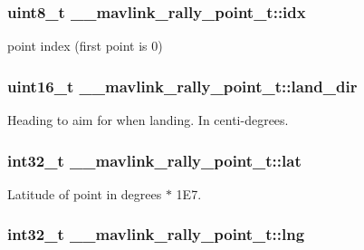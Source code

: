 \hypertarget{struct____mavlink__rally__point__t_a44e656a447965ea917a6d79001cd1b07}{
\subsubsection[{idx}]{\setlength{\rightskip}{0pt plus 5cm}uint8\+\_\+t \+\_\+\+\_\+mavlink\+\_\+rally\+\_\+point\+\_\+t\+::idx}}\label{struct____mavlink__rally__point__t_a44e656a447965ea917a6d79001cd1b07}


point index (first point is 0) 

\hypertarget{struct____mavlink__rally__point__t_a0465147fc43ee3a89e5959b36b2e2f8b}{
\subsubsection[{land\+\_\+dir}]{\setlength{\rightskip}{0pt plus 5cm}uint16\+\_\+t \+\_\+\+\_\+mavlink\+\_\+rally\+\_\+point\+\_\+t\+::land\+\_\+dir}}\label{struct____mavlink__rally__point__t_a0465147fc43ee3a89e5959b36b2e2f8b}


Heading to aim for when landing. In centi-\/degrees. 

\hypertarget{struct____mavlink__rally__point__t_a42803d18a5c9abf2e3cfca5ca68c3c47}{
\subsubsection[{lat}]{\setlength{\rightskip}{0pt plus 5cm}int32\+\_\+t \+\_\+\+\_\+mavlink\+\_\+rally\+\_\+point\+\_\+t\+::lat}}\label{struct____mavlink__rally__point__t_a42803d18a5c9abf2e3cfca5ca68c3c47}


Latitude of point in degrees $\ast$ 1\+E7. 

\hypertarget{struct____mavlink__rally__point__t_a54029ae69f5e7fb5d1efe1ed19efcdb4}{
\subsubsection[{lng}]{\setlength{\rightskip}{0pt plus 5cm}int32\+\_\+t \+\_\+\+\_\+mavlink\+\_\+rally\+\_\+point\+\_\+t\+::lng}}\label{struct____mavlink__rally__point__t_a54029ae69f5e7fb5d1efe1ed19efcdb4}


